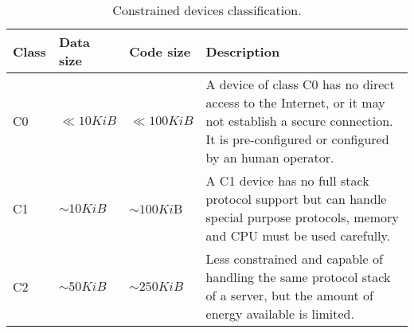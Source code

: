 	\begin{table}[h!]
		\begin{center}
			\begin{tabularx}{\textwidth}{|l|l|l|X|}
				\hline
				\textbf{Class} & \textbf{Data size} & \textbf{Code size} & \textbf{Description}\\
				\hline
				C0 & $\ll 10KiB$  & $\ll  100KiB$ &A device of class C0 has no direct access to the Internet,
												   or it may not establish a secure connection.
												   It is pre-configured or configured by an human operator.\\
				\hline
				C1 & $\sim 10KiB$ & $\sim 100Ki$B &A C1 device has no full stack protocol support
													but can handle special purpose protocols,
													memory and CPU must be used carefully.\\
				\hline
				C2 & $\sim 50KiB$ & $\sim 250KiB$ &Less constrained and capable of handling
												   the same protocol stack of a server,
												   but the amount of energy available is limited.\\
   				\hline
			\end{tabularx}
			\caption{Constrained devices classification.}
			\label{tab:table1}
		\end{center}
	\end{table}